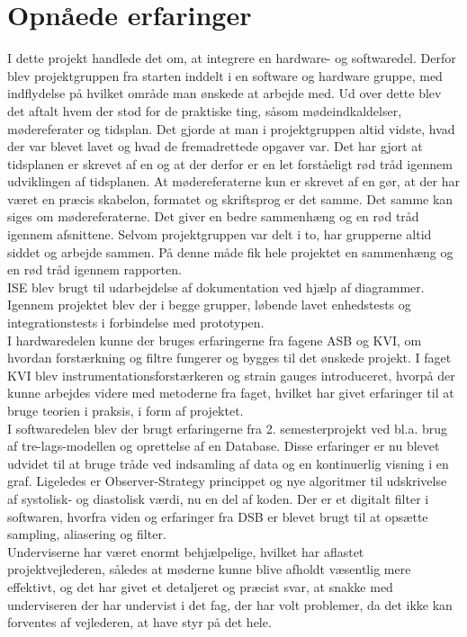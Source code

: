 \section{Opnåede erfaringer}
I dette projekt handlede det om, at integrere en hardware- og softwaredel. Derfor blev projektgruppen fra starten inddelt i en software og hardware gruppe, med indflydelse på hvilket område man ønskede at arbejde med. Ud over dette blev det aftalt hvem der stod for de praktiske ting, såsom mødeindkaldelser, mødereferater og tidsplan. Det gjorde at man i projektgruppen altid vidste, hvad der var blevet lavet og hvad de fremadrettede opgaver var. Det har gjort at tidsplanen er skrevet af en og at der derfor er en let forståeligt rød tråd igennem udviklingen af tidsplanen. At mødereferaterne kun er skrevet af en gør, at der har været en præcis skabelon, formatet og skriftsprog er det samme. Det samme kan siges om mødereferaterne. Det giver en bedre sammenhæng og en rød tråd igennem afsnittene.  
Selvom projektgruppen var delt i to, har grupperne altid siddet og arbejde sammen. På denne måde fik hele projektet en sammenhæng og en rød tråd igennem rapporten. \\
ISE blev brugt til udarbejdelse af dokumentation ved hjælp af diagrammer. Igennem projektet blev der i begge grupper, løbende lavet enhedstests og integrationstests i forbindelse med prototypen.\\
I hardwaredelen kunne der bruges erfaringerne fra fagene ASB og KVI, om hvordan forstærkning og filtre fungerer og bygges til det ønskede projekt. I faget KVI blev instrumentationsforstærkeren og strain gauges introduceret, hvorpå der kunne arbejdes videre med metoderne fra faget, hvilket har givet erfaringer til at bruge teorien i praksis, i form af projektet.\\
I softwaredelen blev der brugt erfaringerne fra 2. semesterprojekt ved bl.a. brug af tre-lags-modellen og oprettelse af en Database. Disse erfaringer er nu blevet udvidet til at bruge tråde ved indsamling af data og en kontinuerlig visning i en graf. Ligeledes er Observer-Strategy princippet og nye algoritmer til udskrivelse af systolisk- og diastolisk værdi, nu en del af koden. Der er et digitalt filter i softwaren, hvorfra viden og erfaringer fra DSB er blevet brugt til at opsætte sampling, aliasering og filter.\\
Underviserne har været enormt behjælpelige, hvilket har aflastet projektvejlederen, således at møderne kunne blive afholdt væsentlig mere effektivt, og det har givet et detaljeret og præcist svar, at snakke med underviseren der har undervist i det fag, der har volt problemer, da det ikke kan forventes af vejlederen, at have styr på det hele. \\
